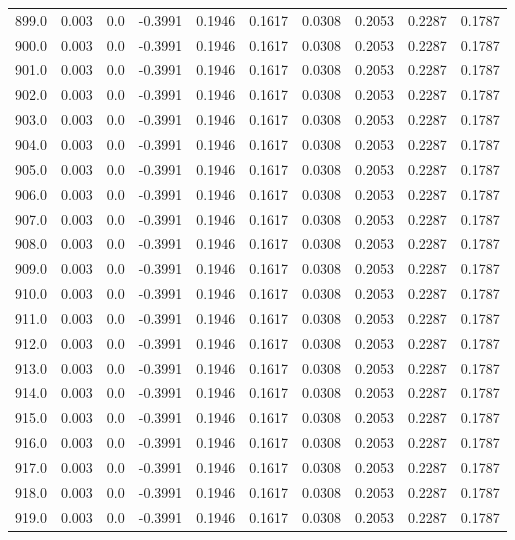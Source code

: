 \begin{longtable}{lrrrrrrrrr}
899.0 & 0.003 & 0.0 & -0.3991 & 0.1946 & 0.1617 & 0.0308 & 0.2053 & 0.2287 & 0.1787 \\
900.0 & 0.003 & 0.0 & -0.3991 & 0.1946 & 0.1617 & 0.0308 & 0.2053 & 0.2287 & 0.1787 \\
901.0 & 0.003 & 0.0 & -0.3991 & 0.1946 & 0.1617 & 0.0308 & 0.2053 & 0.2287 & 0.1787 \\
902.0 & 0.003 & 0.0 & -0.3991 & 0.1946 & 0.1617 & 0.0308 & 0.2053 & 0.2287 & 0.1787 \\
903.0 & 0.003 & 0.0 & -0.3991 & 0.1946 & 0.1617 & 0.0308 & 0.2053 & 0.2287 & 0.1787 \\
904.0 & 0.003 & 0.0 & -0.3991 & 0.1946 & 0.1617 & 0.0308 & 0.2053 & 0.2287 & 0.1787 \\
905.0 & 0.003 & 0.0 & -0.3991 & 0.1946 & 0.1617 & 0.0308 & 0.2053 & 0.2287 & 0.1787 \\
906.0 & 0.003 & 0.0 & -0.3991 & 0.1946 & 0.1617 & 0.0308 & 0.2053 & 0.2287 & 0.1787 \\
907.0 & 0.003 & 0.0 & -0.3991 & 0.1946 & 0.1617 & 0.0308 & 0.2053 & 0.2287 & 0.1787 \\
908.0 & 0.003 & 0.0 & -0.3991 & 0.1946 & 0.1617 & 0.0308 & 0.2053 & 0.2287 & 0.1787 \\
909.0 & 0.003 & 0.0 & -0.3991 & 0.1946 & 0.1617 & 0.0308 & 0.2053 & 0.2287 & 0.1787 \\
910.0 & 0.003 & 0.0 & -0.3991 & 0.1946 & 0.1617 & 0.0308 & 0.2053 & 0.2287 & 0.1787 \\
911.0 & 0.003 & 0.0 & -0.3991 & 0.1946 & 0.1617 & 0.0308 & 0.2053 & 0.2287 & 0.1787 \\
912.0 & 0.003 & 0.0 & -0.3991 & 0.1946 & 0.1617 & 0.0308 & 0.2053 & 0.2287 & 0.1787 \\
913.0 & 0.003 & 0.0 & -0.3991 & 0.1946 & 0.1617 & 0.0308 & 0.2053 & 0.2287 & 0.1787 \\
914.0 & 0.003 & 0.0 & -0.3991 & 0.1946 & 0.1617 & 0.0308 & 0.2053 & 0.2287 & 0.1787 \\
915.0 & 0.003 & 0.0 & -0.3991 & 0.1946 & 0.1617 & 0.0308 & 0.2053 & 0.2287 & 0.1787 \\
916.0 & 0.003 & 0.0 & -0.3991 & 0.1946 & 0.1617 & 0.0308 & 0.2053 & 0.2287 & 0.1787 \\
917.0 & 0.003 & 0.0 & -0.3991 & 0.1946 & 0.1617 & 0.0308 & 0.2053 & 0.2287 & 0.1787 \\
918.0 & 0.003 & 0.0 & -0.3991 & 0.1946 & 0.1617 & 0.0308 & 0.2053 & 0.2287 & 0.1787 \\
919.0 & 0.003 & 0.0 & -0.3991 & 0.1946 & 0.1617 & 0.0308 & 0.2053 & 0.2287 & 0.1787 \\

\end{longtable}
